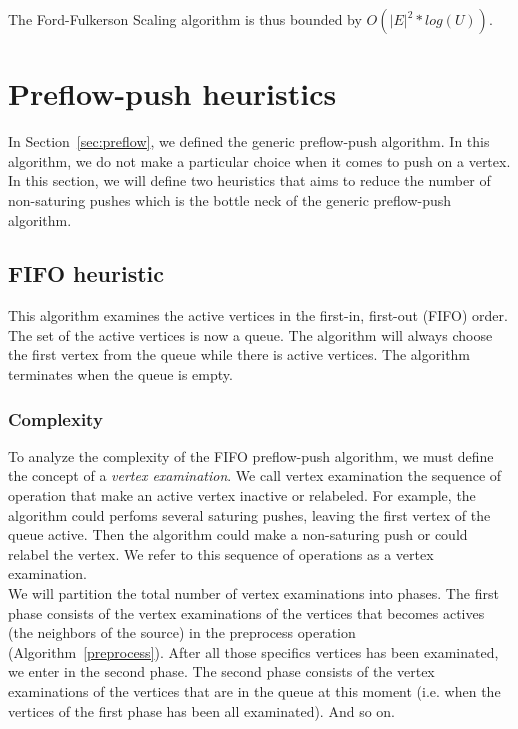 The Ford-Fulkerson Scaling algorithm is thus bounded by $O(|E|^2* log(U))$.

\section{Preflow-push heuristics}

In Section~\ref{sec:preflow}, we defined the generic preflow-push algorithm. In this algorithm, we do not make a particular choice when it comes to push on a vertex. In this section, we will define two heuristics that aims to reduce the number of non-saturing pushes which is the bottle neck of the generic preflow-push algorithm.

\subsection{FIFO heuristic}

This algorithm examines the active vertices in the first-in, first-out (FIFO) order. The set of the active vertices is now a queue. The algorithm will always choose the first vertex from the queue while there is active vertices. The algorithm terminates when the queue is empty. 

\subsubsection{Complexity}

To analyze the complexity of the FIFO preflow-push algorithm, we must define the concept of a \textit{vertex examination}. We call vertex examination the sequence of operation that make an active vertex inactive or relabeled. For example, the algorithm could perfoms several saturing pushes, leaving the first vertex of the queue active. Then the algorithm could make a non-saturing push or could relabel the vertex. We refer to this sequence of operations as a vertex examination.\\

We will partition the total number of vertex examinations into phases. The first phase consists of the vertex examinations of the vertices that becomes actives (the neighbors of the source) in the preprocess operation (Algorithm~\ref{preprocess}). After all those specifics vertices has been examinated, we enter in the second phase. The second phase consists of the vertex examinations of the vertices that are in the queue at this moment (i.e. when the vertices of the first phase has been all examinated). And so on.\\


